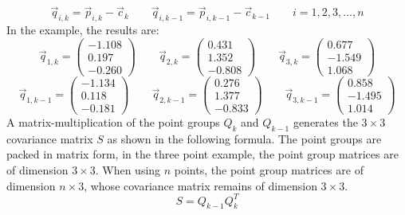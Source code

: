 \begin{equation*}
    \vec{q}_{i,k}=\vec{p}_{i,k}-\vec{c}_{k} \qquad 
    \vec{q}_{i,k-1}=\vec{p}_{i,k-1}-\vec{c}_{k-1} \qquad i = 1, 2, 3, ... , n
\end{equation*}
In the example, the results are:
\begin{equation*}
    \vec{q}_{1,k}=
    \begin{pmatrix}
        -1.108 \\
        0.197 \\
        -0.260
    \end{pmatrix}
    \qquad 
    \vec{q}_{2,k}=
    \begin{pmatrix}
        0.431 \\
        1.352 \\
        -0.808
    \end{pmatrix}
    \qquad     \vec{q}_{3,k}=
    \begin{pmatrix}
        0.677 \\
        -1.549 \\
        1.068
    \end{pmatrix}
\end{equation*}
\begin{equation*}
    \vec{q}_{1,k-1}=
    \begin{pmatrix}
        -1.134 \\
        0.118 \\
        -0.181
    \end{pmatrix}
    \qquad 
    \vec{q}_{2,k-1}=
    \begin{pmatrix}
        0.276 \\
        1.377 \\
        -0.833
    \end{pmatrix}
    \qquad     \vec{q}_{3,k-1}=
    \begin{pmatrix}
        0.858 \\
        -1.495 \\
        1.014
    \end{pmatrix}
\end{equation*}
A matrix-multiplication of the point groups $Q_{k}$ and $Q_{k-1}$ generates the $3\times3$ covariance matrix $S$ as shown in the following formula. The point groups are packed in matrix form, in the three point example, the point group matrices are of dimension $3\times3$. When using $n$ points, the point group matrices are of dimension $n\times3$, whose covariance matrix remains of dimension $3\times3$.
\begin{equation*}
    S= Q_{k-1}Q_{k}^{T}
\end{equation*}

